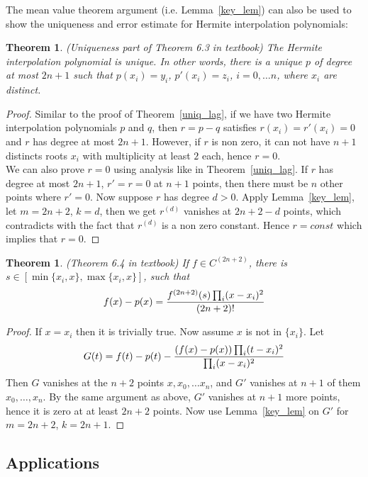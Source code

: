 \documentclass[20pt]{article} %
\theoremstyle{break}
\newtheorem{thm}[definition]{Theorem}
\begin{document}
  The mean value theorem argument (i.e. Lemma~\ref{key_lem}) can also be used to show the uniqueness and error estimate for Hermite interpolation polynomials:

  \begin{thm}\label{uniq_her} (Uniqueness part of Theorem 6.3 in textbook)
 The Hermite interpolation polynomial is unique. In other words, there is a unique $p$ of degree at most $2n+1$ such that $p(x_i)=y_i$, $p'(x_i)=z_i$, $i=0, \dots n$, where $x_i$ are distinct.
\end{thm}
\begin{proof} Similar to the proof of Theorem~\ref{uniq_lag}, if we have two Hermite interpolation polynomials $p$ and $q$, then $r=p-q$ satisfies $r(x_i)=r'(x_i)=0$ and $r$ has degree at most $2n+1$. However, if $r$ is non zero, it can not have $n+1$ distincts roots $x_i$ with multiplicity at least $2$ each, hence $r=0$.\\

  We can also prove $r=0$ using analysis like in Theorem~\ref{uniq_lag}. If $r$ has degree at most $2n+1$, $r'=r=0$ at $n+1$ points, then there must be $n$ other points where $r'=0$. Now suppose $r$ has degree $d>0$. Apply Lemma~\ref{key_lem}, let $m=2n+2$, $k=d$, then we get $r^{(d)}$ vanishes at $2n+2-d$ points, which contradicts with the fact that $r^{(d)}$ is a non zero constant. Hence $r=const$ which implies that $r=0$.
\end{proof}

\newpage

\begin{thm}\label{err_her} (Theorem 6.4 in textbook) If $f\in C^{(2n+2)}$, there is $s\in [\min\{x_i, x\}, \max\{x_i, x\}]$, such that
  \[f(x)-p(x)={f^{(2n+2)}(s)\prod_i(x-x_i)^2\over (2n+2)!}\]
\end{thm}

\begin{proof}
  If $x=x_i$ then it is trivially true. Now assume $x$ is not in $\{x_i\}$. Let
  \[G(t)=f(t)-p(t)-{(f(x)-p(x))\prod_i(t-x_i)^2\over \prod_i(x-x_i)^2}\]
  Then $G$ vanishes at the $n+2$ points $x, x_0, \dots x_n$, and $G'$ vanishes at $n+1$ of them $x_0, \dots, x_n$. By the same argument as above, $G'$ vanishes at $n+1$ more points, hence it is zero at at least $2n+2$ points. Now use Lemma~\ref{key_lem} on $G'$ for $m=2n+2$, $k=2n+1$.
\end{proof}

\newpage

\subsection{Applications}
\end{document}
